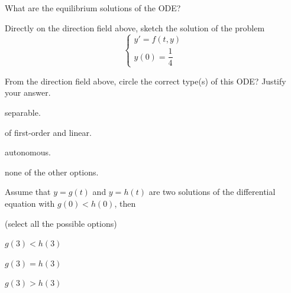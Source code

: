 \begin{parts}
	\item What are the equilibrium solutions of the ODE?


\item Directly on the direction field above, sketch the solution of the problem
$$
\begin{cases}
y'=f(t,y) \\
y(0) = \dfrac14
\end{cases}
$$

\item From the direction field above, circle the correct type(s) of this ODE? Justify your answer.

\begin{enumerate}[label=\color{gray}(\alph*)]
\hfil 
\begin{minipage}{.3\textwidth}
\item separable. \\[-10pt]
\item of first-order and linear.
\end{minipage}
\hfil
\begin{minipage}{.4\textwidth}
\item autonomous. \\[-10pt]
\item none of the other options.
\end{minipage}
\end{enumerate}

\item Assume that $y=g(t)$ and $y=h(t)$ are two solutions of the differential equation with $g(0)<h(0)$, then

\hfill (select all the possible options)\\[-10pt]

\begin{enumerate}[label=\color{gray}(\alph*)]
\hfil 
\begin{minipage}{.2\textwidth}
\item $g(3) < h(3)$
\end{minipage}
\hfil
\begin{minipage}{.2\textwidth}
\item $g(3) = h(3)$
\end{minipage}
\hfil
\begin{minipage}{.2\textwidth}
\item $g(3) > h(3)$
\end{minipage}
\end{enumerate}

\end{parts}





